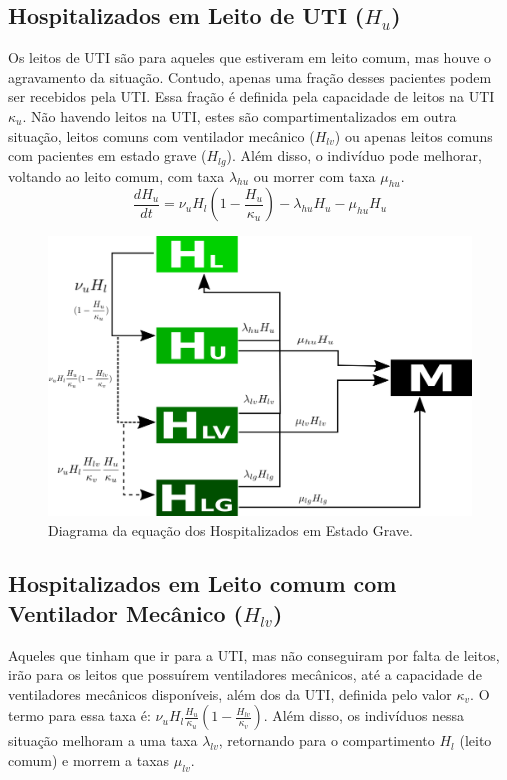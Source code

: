\documentclass[12pt,a4papper]{article}
\begin{document}
\subsection{Hospitalizados em Leito de UTI ($H_u$)}
Os leitos de UTI são para aqueles que estiveram em leito comum, mas houve o agravamento da situação. Contudo, apenas uma fração desses pacientes podem ser recebidos pela UTI. Essa fração é definida pela capacidade de leitos na UTI $\kappa_u$. Não havendo leitos na UTI, estes são compartimentalizados em outra situação, leitos comuns com ventilador mecânico ($H_{lv}$) ou apenas leitos comuns com pacientes em estado grave ($H_{lg}$). Além disso, o indivíduo pode melhorar, voltando ao leito comum, com taxa $\lambda_{hu}$ ou morrer com taxa $\mu_{hu}$.
\begin{equation}
	\frac{dH_u}{dt}=\nu_u H_l(1 - \frac{H_u}{\kappa_{u}}) -\lambda_{hu} H_u -\mu_{hu} H_u
\end{equation}
\begin{figure}[!h]
	\centering
	\includegraphics[scale=0.4]{covidHu}
	\caption{Diagrama da equação dos Hospitalizados em Estado Grave.}
	\label{fig:universe}
\end{figure}


\subsection{Hospitalizados em Leito comum com Ventilador Mecânico ($H_{lv}$)}
Aqueles que tinham que ir para a UTI, mas não conseguiram por falta de leitos, irão para os leitos que possuírem ventiladores mecânicos, até a capacidade de ventiladores mecânicos disponíveis, além dos da UTI, definida pelo valor $\kappa_v$. O termo para essa taxa é: $\nu_u H_l \frac{H_u}{\kappa_{u}}(1-\frac{H_{lv}}{\kappa_{v}})$. Além disso, os indivíduos nessa situação melhoram a uma taxa $\lambda_{lv}$, retornando para o compartimento $H_l$ (leito comum) e morrem a taxas $\mu_{lv}$.
\end{document}
